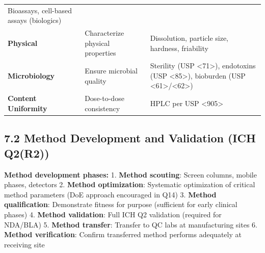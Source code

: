 \documentclass[
  11pt,
  a4paper,
]{report}
\begin{document}
\begin{longtable}[]{@{}lll@{}}
\begin{minipage}[t]{0.42\columnwidth}
Bioassays, cell-based assays (biologics)\strut
\end{minipage}\tabularnewline
\begin{minipage}[t]{0.26\columnwidth}\raggedright
\textbf{Physical}\strut
\end{minipage} & \begin{minipage}[t]{0.23\columnwidth}\raggedright
Characterize physical properties\strut
\end{minipage} & \begin{minipage}[t]{0.42\columnwidth}\raggedright
Dissolution, particle size, hardness, friability\strut
\end{minipage}\tabularnewline
\begin{minipage}[t]{0.26\columnwidth}\raggedright
\textbf{Microbiology}\strut
\end{minipage} & \begin{minipage}[t]{0.23\columnwidth}\raggedright
Ensure microbial quality\strut
\end{minipage} & \begin{minipage}[t]{0.42\columnwidth}\raggedright
Sterility (USP \textless71\textgreater), endotoxins (USP
\textless85\textgreater), bioburden (USP
\textless61\textgreater/\textless62\textgreater)\strut
\end{minipage}\tabularnewline
\begin{minipage}[t]{0.26\columnwidth}\raggedright
\textbf{Content Uniformity}\strut
\end{minipage} & \begin{minipage}[t]{0.23\columnwidth}\raggedright
Dose-to-dose consistency\strut
\end{minipage} & \begin{minipage}[t]{0.42\columnwidth}\raggedright
HPLC per USP \textless905\textgreater{}\strut
\end{minipage}\tabularnewline
\bottomrule
\end{longtable}

\hypertarget{method-development-and-validation-ich-q2r2}{%
\subsection{7.2 Method Development and Validation (ICH
Q2(R2))}\label{method-development-and-validation-ich-q2r2}}

\textbf{Method development phases:} 1. \textbf{Method scouting}: Screen
columns, mobile phases, detectors 2. \textbf{Method optimization}:
Systematic optimization of critical method parameters (DoE approach
encouraged in Q14) 3. \textbf{Method qualification}: Demonstrate fitness
for purpose (sufficient for early clinical phases) 4. \textbf{Method
validation}: Full ICH Q2 validation (required for NDA/BLA) 5.
\textbf{Method transfer}: Transfer to QC labs at manufacturing sites 6.
\textbf{Method verification}: Confirm transferred method performs
adequately at receiving site
\end{document}
